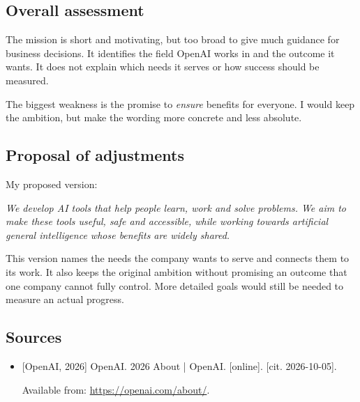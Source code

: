 \documentclass[
  a4paper,
]{article}
\providecommand{\tightlist}{%
  \setlength{\itemsep}{0pt}\setlength{\parskip}{0pt}}
\begin{document}
\subsection{Overall assessment}\label{overall-assessment}

The mission is short and motivating, but too broad to give much guidance
for business decisions. It identifies the field OpenAI works in and the
outcome it wants. It does not explain which needs it serves or how
success should be measured.

The biggest weakness is the promise to \emph{ensure} benefits for
everyone. I would keep the ambition, but make the wording more concrete
and less absolute.

\subsection{Proposal of adjustments}\label{proposal-of-adjustments}

My proposed version:

\emph{We develop AI tools that help people learn, work and solve
problems. We aim to make these tools useful, safe and accessible, while
working towards artificial general intelligence whose benefits are
widely shared.}

This version names the needs the company wants to serve and connects
them to its work. It also keeps the original ambition without promising
an outcome that one company cannot fully control. More detailed goals
would still be needed to measure an actual progress.

\subsection{Sources}\label{sources}

\begin{itemize}
\tightlist
\item
  {[}OpenAI, 2026{]} OpenAI. 2026 About | OpenAI. {[}online{]}. {[}cit.
  2026-10-05{]}. 
  
  Available from: \url{https://openai.com/about/}.
\end{itemize}
\end{document}
